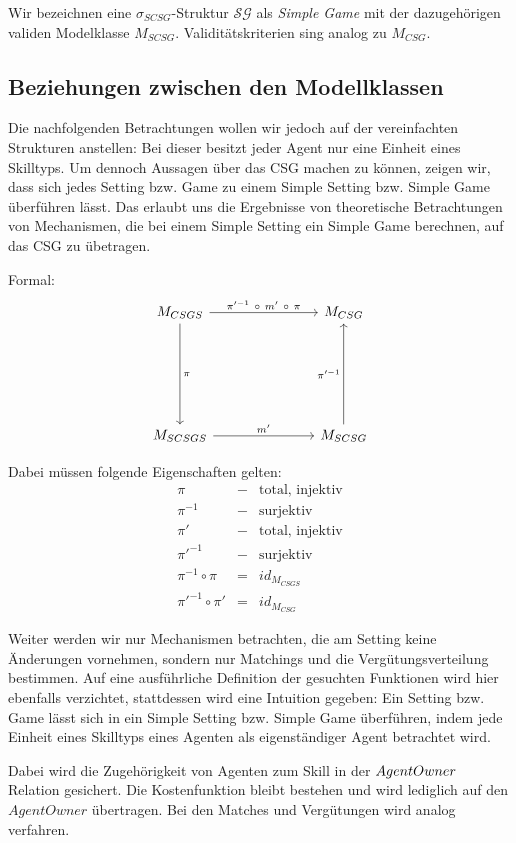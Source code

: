 \noindent
Wir bezeichnen eine $\sigma_{SCSG}$-Struktur $\mathcal{SG}$ als \textit{Simple Game} mit der dazugehörigen validen Modelklasse $M_{SCSG}$. Validitätskriterien sing analog zu $M_{CSG}$.


\subsection{Beziehungen zwischen den Modellklassen}
\label{bez}

Die nachfolgenden Betrachtungen wollen wir jedoch auf der vereinfachten Strukturen anstellen: Bei  dieser besitzt jeder Agent nur eine Einheit eines Skilltyps. Um dennoch Aussagen über das CSG machen zu können, zeigen wir, dass sich jedes Setting bzw. Game zu einem Simple Setting bzw. Simple Game überführen lässt. Das erlaubt uns die Ergebnisse von theoretische Betrachtungen von Mechanismen, die bei einem Simple Setting ein Simple Game berechnen, auf das CSG zu übetragen.

\noindent
Formal:
\[
\begin{tikzcd}[column sep=1in,row sep=1in]
M_{CSGS} \arrow{d}{\pi} \arrow{r}{\pi'^{-1}\ \circ\  m'\ \circ\ \pi} & M_{CSG} \\
M_{SCSGS} \arrow{r}{m'} & M_{SCSG} \arrow{u}{\pi'^{-1}}
\end{tikzcd}
\]

\noindent
Dabei müssen folgende Eigenschaften gelten:
\begin{eqnarray}
  \pi &-&\text{total, injektiv} \\
  \pi^{-1}&-&\text{surjektiv} \\
  \pi' &-&\text{total, injektiv} \\
  \pi'^{-1}&-&\text{surjektiv} \\
  \pi^{-1}\circ\pi &=& id_{M_{CSGS}} \\
  \pi'^{-1}\circ\pi' &=& id_{M_{CSG}}
\end{eqnarray}

\noindent
Weiter werden wir nur Mechanismen betrachten, die am Setting keine Änderungen vornehmen, sondern nur Matchings und die Vergütungsverteilung bestimmen. Auf eine ausführliche Definition der gesuchten Funktionen wird hier ebenfalls verzichtet,  stattdessen wird eine Intuition gegeben: Ein Setting bzw. Game lässt sich in ein Simple Setting bzw. Simple Game überführen, indem jede Einheit eines Skilltyps eines Agenten als eigenständiger Agent betrachtet wird.

Dabei wird die Zugehörigkeit von Agenten zum Skill in der $Agent\-Owner$ Relation gesichert. Die Kostenfunktion bleibt bestehen und wird lediglich auf den $AgentOwner$ übertragen. Bei den Matches und Vergütungen wird analog verfahren.

